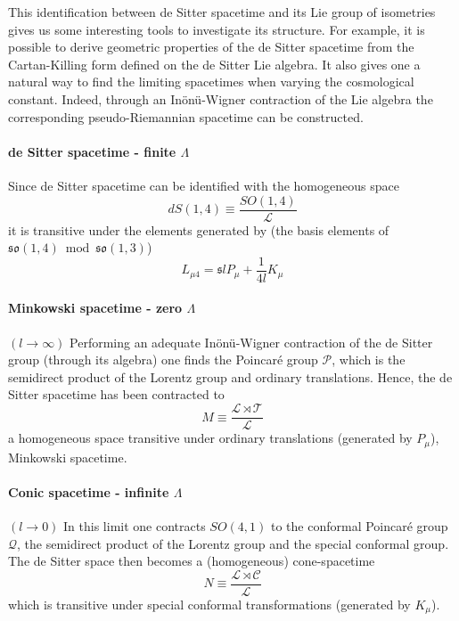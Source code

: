 \documentclass[10pt]{article}
\newcommand{\mcal}{\mathcal}
\newcommand{\mfrak}{\mathfrak}
\newcommand{\sfr}{\mathfrak{s}}
\begin{document}
This identification between de Sitter spacetime and its Lie group 
of isometries gives us some interesting tools to investigate its 
structure. For example, it is possible to derive geometric 
properties of the de Sitter spacetime from the Cartan-Killing 
form defined on the de Sitter Lie algebra. It also gives one a 
natural way to find the limiting spacetimes when varying the 
cosmological constant. Indeed, through an In\"on\"u-Wigner 
contraction of the Lie algebra the corresponding 
pseudo-Riemannian spacetime can be constructed.

\paragraph{de Sitter spacetime - finite $\Lambda$}
Since de Sitter spacetime can be identified with the homogeneous 
space
\begin{equation}
	dS(1,4) \equiv \frac{SO(1,4)}{\mcal{L}}
\end{equation}
it is transitive under the elements generated by (the basis 
elements of $\mfrak{so}(1,4) \bmod \mfrak{so}(1,3)$)
\begin{equation}
	L_{\mu 4} = \sfr l P_\mu + \frac{1}{4l} K_\mu
\end{equation}

\paragraph{Minkowski spacetime - zero $\Lambda$} $(l\rightarrow 
\infty)$
Performing an adequate In\"on\"u-Wigner contraction of the de 
Sitter group (through its algebra) one finds the Poincar\'e group 
$\mcal{P}$, which is the semidirect product of the Lorentz group 
and ordinary translations. Hence, the de Sitter spacetime has 
been contracted to
\begin{equation}
	M \equiv \frac{\mcal{L}\rtimes \mcal{T}}{\mcal{L}}
\end{equation}
a homogeneous space transitive under ordinary translations 
(generated by $P_\mu$), Minkowski spacetime.

\paragraph{Conic spacetime - infinite $\Lambda$} $(l\rightarrow 
0)$
In this limit one contracts $SO(4,1)$ to the conformal Poincar\'e 
group $\mcal{Q}$, the semidirect product of the Lorentz group and 
the special conformal group. The de Sitter space then becomes a 
(homogeneous) cone-spacetime
\begin{equation}
	N \equiv \frac{\mcal{L} \rtimes \mcal{C}}{\mcal{L}}
\end{equation}
which is transitive under special conformal transformations 
(generated by $K_\mu$).
\end{document}
